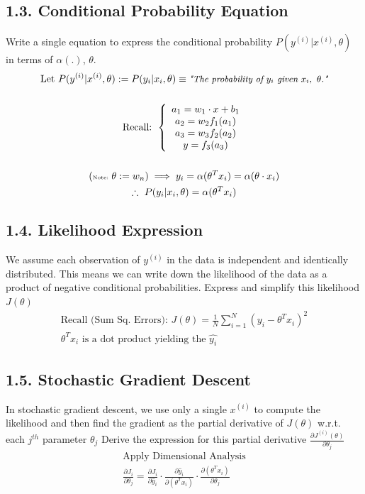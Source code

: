\documentclass[11pt]{article}
\theoremstyle{plain}
\begin{document}
\subsection*{1.3. Conditional Probability Equation }
Write a single equation to express the conditional probability $P(y^{(i)}|x^{(i)},\theta)$ in terms of $\alpha(.)$, $\theta$.
\[
	\begin{gathered}
		\text{Let } P(y^{(i)}|x^{(i)},\theta) := P(y_{i}|x_{i},\theta) \equiv \small{\textit{\text{"The probability of $y_i$ given $x_i, ~\theta$."}}} \\\\
		\text{Recall: }
		\left \{
		\begin{array}{cc}
			a_1 = w_1 \cdot x + b_1 \\
			a_2 = w_2 f_1(a_1)      \\
			a_3 = w_3 f_2(a_2)      \\
			y = f_3(a_3)
		\end{array}
		\right . \\\\
		\tiny{(\text{Note: } \theta := w_n)} \implies y_i = \alpha(\theta^T x_i) = \alpha(\theta \cdot x_i) \\
		\therefore ~P(y_{i}|x_{i},\theta) = \alpha(\theta^T x_i)
	\end{gathered}
\]

\subsection*{1.4. Likelihood Expression }
We assume each observation of $y^{(i)}$ in the data is independent and identically distributed.  This means we can write down the likelihood of the data as a product of negative conditional probabilities.  Express and simplify this likelihood $J(\theta)$
\[
	\begin{gathered}
		\text{Recall (Sum Sq. Errors): } J(\theta) = \frac{1}{N}\sum_{i=1}^{N} (y_i-\theta^Tx_i)^2 \\
		\theta^Tx_i \text{ is a dot product yielding the } \hat{y_i}
	\end{gathered}
\]

\subsection*{1.5. Stochastic Gradient Descent }
In stochastic gradient descent, we use only a single $x^{(i)}$ to compute the likelihood and then find the gradient as the partial derivative of $J(\theta)$ w.r.t.  each $j^{th}$ parameter $\theta_{j}$ Derive the expression for this partial derivative $\frac{\partial J^{(i)}(\theta)}{\partial\theta_{j}}$
\[
	\begin{gathered}
		\text{Apply Dimensional Analysis} \\
		\frac {\partial J_i} {\partial\theta_{j}} =
		\frac {\partial J_i} {\partial \hat{y}_i} \cdot \frac
		{\partial \hat{y}_i} {\partial (\theta^Tx_i)} \cdot
		\frac {\partial (\theta^Tx_i)} {\partial \theta_j}
	\end{gathered}
\]
\end{document}
